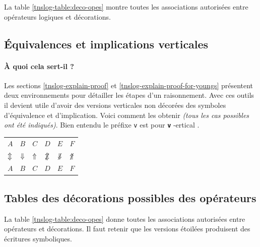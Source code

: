\documentclass[12pt,a4paper]{book}
\theoremstyle{definition}
\newcommand\whyprefix[2]{%
	\textbf{\prefix{#1}}-#2%
}
\newcommand\prefix[1]{%
	\texttt{#1}%
}
\begin{document}
{{La table \ref{tnslog-table:deco-opes}  montre toutes les associations autorisées entre opérateurs logiques et décorations.




\subsection{Équivalences et implications verticales}

\paragraph{À quoi cela sert-il ?}

Les sections \ref{tnslog-explain-proof} et \ref{tnslog-explain-proof-for-youngs} présentent deux environnements pour détailler les étapes d'un raisonnement.
Avec ces outils il devient utile d'avoir des versions verticales non décorées des symboles d'équivalence et d'implication. Voici comment les obtenir \emph{(tous les cas possibles ont été indiqués)}.
Bien entendu le préfixe \prefix{v} est pour \whyprefix{v}{ertical}.

\begin{latexex}
\begin{tabular}{cccccc}
    $A$          & $B$
  & $C$          & $D$
  & $E$          & $F$
  \\
    $\mathrel{\Updownarrow}$      & $\mathrel{\Downarrow}$   
  & $\mathrel{\Uparrow}$  & $\nviff$
  & $\nvimplies$ & $\nvliesimp$
  \\
    $A$          & $B$
  & $C$          & $D$
  & $E$          & $F$
\end{tabular}
\end{latexex}



\subsection{Tables des décorations possibles des opérateurs}

La table \ref{tnslog-table:deco-opes}  donne toutes les associations autorisées entre opérateurs et décorations.
Il faut retenir que les versions étoilées produisent des écritures symboliques. 


}}
\end{document}
